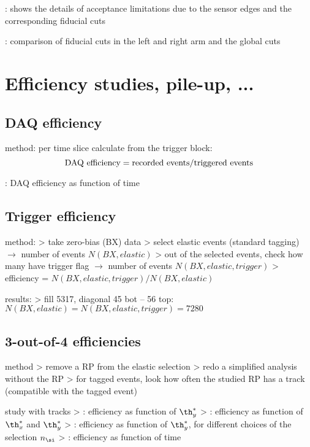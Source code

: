 \> : shows the details of acceptance limitations due to the sensor edges and the corresponding fiducial cuts

\> : comparison of fiducial cuts in the left and right arm and the global cuts





\section{Efficiency studies, pile-up, ...}

\subsection{DAQ efficiency}

\> method: per time slice calculate from the trigger block:
$$\hbox{DAQ efficiency} = \hbox{recorded events} / \hbox{triggered events}$$

\> : DAQ efficiency as function of time

\subsection{Trigger efficiency}

\> method:
\>> take zero-bias (BX) data
\>> select elastic events (standard tagging) $\rightarrow$ number of events $N(BX,elastic)$
\>> out of the selected events, check how many have trigger flag $\rightarrow$ number of events $N(BX,elastic,trigger)$
\>> efficiency = $N(BX,elastic,trigger) / N(BX,elastic)$

\> results:
\>> fill 5317, diagonal 45 bot -- 56 top: $N(BX,elastic) = N(BX,elastic,trigger) = 7280$

\subsection{3-out-of-4 efficiencies}

\> method
\>> remove a RP from the elastic selection
\>> redo a simplified analysis without the RP
\>> for tagged events, look how often the studied RP has a track (compatible with the tagged event)

\> study with tracks
\>> : efficiency as function of $\th_y^*$
\>> : efficiency as function of $\th_x^*$ and $\th_y^*$
\>> : efficiency as function of $\th_y^*$, for different choices of the selection $n_\si$
\>> : efficiency as function of time

